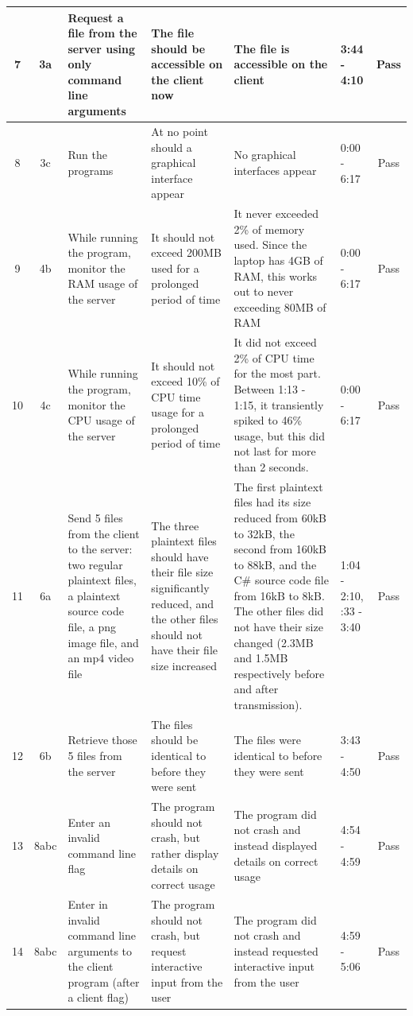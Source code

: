 \documentclass[../main.tex]{subfiles}
\begin{document}
\begin{longtable}{|c|c|p{3.1cm}|p{3.1cm}|p{3.4cm}|p{0.9cm}|c|}
\hline
7 & 3a & Request a file from the server using only command line arguments & The file should be accessible on the client now & The file is accessible on the client & 3:44 - 4:10 & Pass \\
\hline
8 & 3c & Run the programs & At no point should a graphical interface appear & No graphical interfaces appear & 0:00 - 6:17 & Pass \\
\hline
9 & 4b & While running the program, monitor the RAM usage of the server & It should not exceed 200MB used for a prolonged period of time & It never exceeded 2\% of memory used. Since the laptop has 4GB of RAM, this works out to never exceeding 80MB of RAM & 0:00 - 6:17 & Pass \\
\hline
10 & 4c & While running the program, monitor the CPU usage of the server & It should not exceed 10\% of CPU time usage for a prolonged period of time & It did not exceed 2\% of CPU time for the most part. Between 1:13 - 1:15, it transiently spiked to 46\% usage, but this did not last for more than 2 seconds. & 0:00 - 6:17 & Pass \\
\hline
11 & 6a & Send 5 files from the client to the server: two regular plaintext files, a plaintext source code file, a png image file, and an mp4 video file & The three plaintext files should have their file size significantly reduced, and the other files should not have their file size increased & The first plaintext files had its size reduced from 60kB to 32kB, the second from 160kB to 88kB, and the C\# source code file from 16kB to 8kB. The other files did not have their size changed (2.3MB and 1.5MB respectively before and after transmission). & 1:04 - 2:10, \newline\newline 2:33 - 3:40 & Pass \\
\hline
12 & 6b & Retrieve those 5 files from the server & The files should be identical to before they were sent & The files were identical to before they were sent & 3:43 - 4:50 & Pass \\
\hline
13 & 8abc & Enter an invalid command line flag & The program should not crash, but rather display details on correct usage & The program did not crash and instead displayed details on correct usage & 4:54 - 4:59 & Pass \\
\hline
14 & 8abc & Enter in invalid command line arguments to the client program (after a client flag) & The program should not crash, but request interactive input from the user & The program did not crash and instead requested interactive input from the user & 4:59 - 5:06 & Pass \\

\end{longtable}
\end{document}
